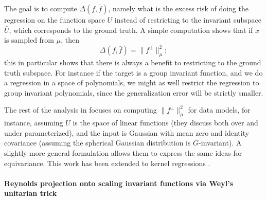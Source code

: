 \documentclass[twoside,11pt]{article}
\begin{document}
The goal is to compute $\Delta(f, \bar f)$, namely what is the excess risk of doing the regression on the function space $U$ instead of restricting to the invariant subspace $\bar U$, which corresponds to the ground truth. A simple computation shows that if $x$ is sampled from $\mu$, then
\begin{equation} \label{eq.proj}
    \Delta(f, \bar f) = \|f^\perp\|^2_\mu;
\end{equation}
this in particular shows that there is always a benefit to restricting to the ground truth subspace. For instance if the target is a group invariant function, and we do a regression in a space of polynomials, we might as well restrict the regression to group invariant polynomials, since the generalization error will be strictly smaller.

The rest of the analysis in \citet{elesedy2021provably} focuses on computing $\|f^\perp\|^2_\mu$ for data models, for instance, assuming $U$ is the space of linear functions (they discuss both over and under parameterized), and the input is Gaussian with mean zero and identity covariance (assuming the spherical Gaussian distribution is $G$-invariant). A slightly more general formulation allows them to express the same ideas for equivariance. This work has been extended to kernel regressions \citep{elesedy_kernel}.

\paragraph{Reynolds projection onto scaling invariant functions via Weyl's unitarian trick}
\end{document}
